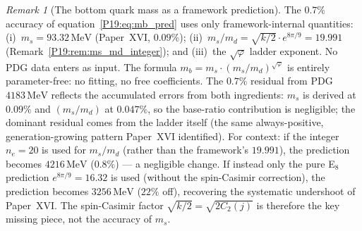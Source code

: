 \documentclass[11pt,a4paper]{article}
\theoremstyle{definition}\newtheorem{definition}[theorem]{Definition}
\theoremstyle{remark}
\newtheorem{remark}[theorem]{Remark}
\newcommand{\vp}{\varphi}
\begin{document}
\begin{remark}[The bottom quark mass as a framework prediction]
\label{P19:rem:mb_prediction}
The $0.7\%$ accuracy of equation~\eqref{P19:eq:mb_pred} uses only
framework-internal quantities:
(i)~$m_s=93.32\,\mathrm{MeV}$ (Paper~XVI, $0.09\%$);
(ii)~$m_s/m_d=\sqrt{k/2}\cdot e^{8\pi/9}=19.991$
(Remark~\ref{P19:rem:ms_md_integer}); and (iii)~the
$\sqrt{\vp}$ ladder exponent.  No PDG data enters as input.
The formula $m_b=m_s\cdot(m_s/m_d)^{\sqrt{\vp}}$ is entirely
parameter-free: no fitting, no free coefficients.
The $0.7\%$ residual from PDG $4183\,\mathrm{MeV}$ reflects the
accumulated errors from both ingredients: $m_s$ is derived at
$0.09\%$ and $(m_s/m_d)$ at $0.047\%$, so the base-ratio
contribution is negligible; the dominant residual comes from
the ladder itself (the same always-positive, generation-growing
pattern Paper~XVI identified).
For context: if the integer $n_e=20$ is used for $m_s/m_d$ (rather
than the framework's $19.991$), the prediction becomes
$4216\,\mathrm{MeV}$ ($0.8\%$) --- a negligible change.  If instead
only the pure E$_8$ prediction $e^{8\pi/9}=16.32$ is used (without
the spin-Casimir correction), the prediction becomes
$3256\,\mathrm{MeV}$ ($22\%$ off), recovering the systematic undershoot
of Paper~XVI.  The spin-Casimir factor $\sqrt{k/2}=\sqrt{2C_2(j)}$
is therefore the key missing piece, not the accuracy of $m_s$.
\end{remark}
\end{document}

